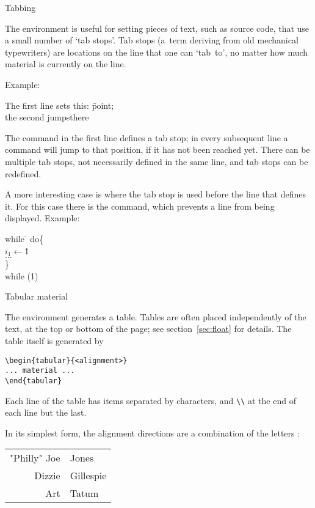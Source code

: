  {Tabbing}

The  environment is useful for setting pieces of text, such
as source code, that use a small number of `tab stops'. Tab stops
(a~term deriving from old mechanical typewriters) are locations on the
line that one can `tab~to', no matter how much material is currently
on the line.

Example:
\begin{examplewithcode}
\begin{tabbing}
The first line sets this: \=point;\\
the second jumps\>there
\end{tabbing}
\end{examplewithcode}
The \cs{=} command in the first line defines a tab stop; in every
subsequent line a~\cs{>} command will jump to that position, if it has
not been reached yet. There can be multiple tab stops, not necessarily
defined in the same line, and tab stops can be redefined.

A more interesting case is where the tab stop is used before the line
that defines it. For this case there is the  command, which
prevents a line from being displayed. Example:
\begin{examplewithcode}
\begin{tabbing}
while \=\kill
do\>\{\\
\>$i_1\leftarrow{}$\=1\\
\>$\ldots$\\
\>\}\\
while (1)
\end{tabbing}
\end{examplewithcode}

 {Tabular material}
\label{sec:tabular}

The  environment generates a
table. Tables are often placed independently of the text, at the top
or bottom of the page; see section~\ref{sec:float} for details.
The table itself is generated by
\begin{verbatim}
\begin{tabular}{<alignment>}
... material ...
\end{tabular}
\end{verbatim}
Each line of the table has items separated by 
characters, and \verb+\\+ at the end of each line but the last.

In its simplest form, the alignment directions are a combination of
the letters :
\begin{examplewithcode}
\begin{tabular}{rl}
"Philly" Joe & Jones\\ Dizzie & Gillespie\\ Art&Tatum
\end{tabular}
\end{examplewithcode}

